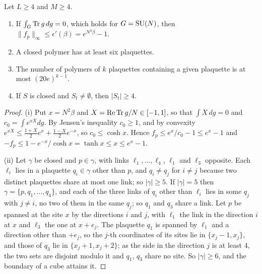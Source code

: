 \begin{lemma}\label{lem:closedpolymers}
Let $L\ge4$ and $M\ge4$.
\begin{enumerate}[label=\textup{(\roman*)},leftmargin=*]
\item If $\int_G\operatorname{Tr} g\,dg=0$, which holds for $G=\mathrm{SU}(N)$, then
$\|f_p\|_\infty\le\epsilon'(\beta)=e^{N^2\beta}-1$.
\item A closed polymer has at least six plaquettes.
\item The number of polymers of $k$ plaquettes containing a given plaquette
is at most $(20e)^{k-1}$.
\item If $S$ is closed and $S_t\ne\emptyset$, then $|S_t|\ge4$.
\end{enumerate}
\end{lemma}

\begin{proof}
(i) Put $x=N^2\beta$ and $X=\operatorname{Re}\operatorname{Tr} g/N\in[-1,1]$, so that $\int X\,dg=0$ and
$c_0=\int e^{xX}dg$. By Jensen's inequality $c_0\ge1$, and by convexity
$e^{xX}\le\frac{1+X}2e^{x}+\frac{1-X}2e^{-x}$, so $c_0\le\cosh x$. Hence
$f_p\le e^{x}/c_0-1\le e^x-1$ and $-f_p\le1-e^{-x}/\cosh x=\tanh x\le x\le
e^x-1$.

(ii) Let $\gamma$ be closed and $p\in\gamma$, with links $\ell_1,\dots,
\ell_4$, $\ell_1$ and $\ell_3$ opposite. Each $\ell_i$ lies in a plaquette
$q_i\in\gamma$ other than $p$, and $q_i\ne q_j$ for $i\ne j$ because two
distinct plaquettes share at most one link; so $|\gamma|\ge5$. If
$|\gamma|=5$ then $\gamma=\{p,q_1,\dots,q_4\}$, and each of the three links
of $q_i$ other than $\ell_i$ lies in some $q_j$ with $j\ne i$, no two of them
in the same $q_j$; so $q_1$ and $q_3$ share a link. Let $p$ be spanned at
the site $x$ by the directions $i$ and $j$, with $\ell_1$ the link in the
direction $i$ at $x$ and $\ell_3$ the one at $x+e_j$. The plaquette $q_1$
is spanned by $\ell_1$ and a direction other than $+e_j$, so the $j$-th
coordinates of its sites lie in $\{x_j-1,x_j\}$, and those of $q_3$ lie in
$\{x_j+1,x_j+2\}$; as the side in the direction $j$ is at least $4$, the two
sets are disjoint modulo it and $q_1$, $q_3$ share no site. So $|\gamma|\ge
6$, and the boundary of a cube attains it.


\end{proof}
